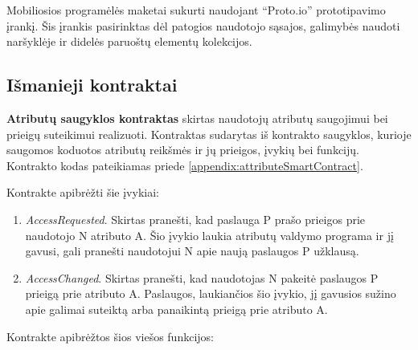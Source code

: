 Mobiliosios programėlės maketai sukurti naudojant \enquote{Proto.io} prototipavimo įrankį. Šis įrankis pasirinktas dėl
patogios naudotojo sąsajos, galimybės naudoti naršyklėje ir didelės paruoštų elementų kolekcijos.

\subsection{Išmanieji kontraktai}

\textbf{Atributų saugyklos kontraktas} skirtas naudotojų atributų saugojimui bei prieigų suteikimui realizuoti. Kontraktas sudarytas iš kontrakto saugyklos,
kurioje saugomos koduotos atributų reikšmės ir jų prieigos, įvykių bei funkcijų.
Kontrakto kodas pateikiamas priede \hypertarget{appendix:attributeSmartContract}{\ref{appendix:attributeSmartContract}}.

Kontrakte apibrėžti šie įvykiai:

\begin{enumerate}
    \item \textit{AccessRequested}. Skirtas pranešti, kad paslauga P prašo prieigos prie naudotojo N atributo A. Šio įvykio laukia
    atributų valdymo programa ir jį gavusi, gali pranešti naudotojui N apie naują paslaugos P užklausą.
    \item \textit{AccessChanged}. Skirtas pranešti, kad naudotojas N pakeitė paslaugos P prieigą prie atributo A. Paslaugos, 
    laukiančios šio įvykio, jį gavusios sužino apie galimai suteiktą arba panaikintą prieigą prie atributo A.
\end{enumerate}

Kontrakte apibrėžtos šios viešos funkcijos:

